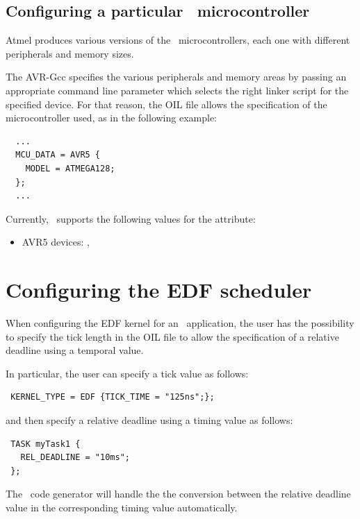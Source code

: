 \subsection{Configuring a particular \avr\ microcontroller}

Atmel produces various versions of the \avr\ microcontrollers, each
one with different peripherals and memory sizes.

The AVR-Gcc specifies the various peripherals and memory areas by
passing an appropriate command line parameter which selects the right
linker script for the specified device. For that reason, the OIL file allows 
the specification of the microcontroller used, as in the following example:

\begin{lstlisting}
  ...
  MCU_DATA = AVR5 {
    MODEL = ATMEGA128;
  };
  ...
\end{lstlisting}

Currently, \ee\ supports the following values for the 
attribute:
\begin{itemize}
\item AVR5 devices: \newline
  ,\newline
\end{itemize}



\section{Configuring the EDF scheduler}

When configuring the EDF kernel for an \ee\ application, the user has
the possibility to specify the tick length in the OIL file to allow
the specification of a relative deadline using a temporal value.

In particular, the user can specify a tick value as follows:

\begin{lstlisting}
 KERNEL_TYPE = EDF {TICK_TIME = "125ns";};
\end{lstlisting}

and then specify a relative deadline using a timing value as follows:

\begin{lstlisting}
 TASK myTask1 {
   REL_DEADLINE = "10ms";
 };
\end{lstlisting}

The \rtd\ code generator will handle the the conversion between the
relative deadline value in the corresponding timing value
automatically.

